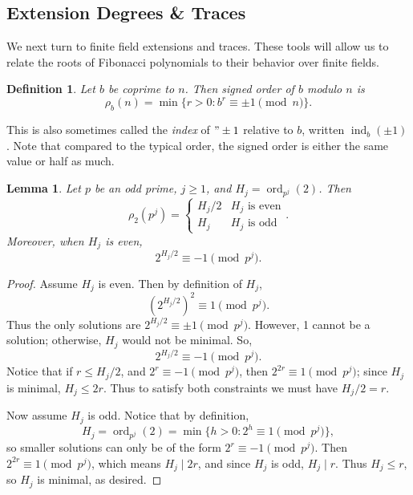 \documentclass[a4paper]{article}
\newtheorem{lemma}[theorem]{Lemma}
\newtheorem{definition}[theorem]{Definition}
\newcommand{\ord}[2][]{\operatorname{ord}_{#1}\!\left( #2 \right)}
\begin{document}
	\subsection{Extension Degrees \& Traces}
	We next turn to finite field extensions and traces.
	These tools will allow us to relate the roots of Fibonacci polynomials to their behavior over finite fields.
	
	\begin{definition}
		Let $b$ be coprime to $n$.
		Then \textit{signed order} of $b$ modulo $n$ is
		\begin{equation*}
			\rho_b(n) = \min{\{r > 0 : b^r \equiv \pm 1 \pmod{n}\}}.
		\end{equation*}
	\end{definition}
	This is also sometimes called the \textit{index} of $"\pm 1$ relative to $b$, written $\operatorname{ind}_{b}(\pm 1)$.
	Note that compared to the typical order, the signed order is either the same value or half as much.
	
	\begin{lemma}\label{signedOrder}
		Let $p$ be an odd prime, $j \ge 1$, and $H_j = \ord[p^j]{2}$.
		Then
		\begin{equation*}
			\rho_{2}{(p^j)} = \begin{cases}
				H_j / 2 & H_j \text{ is even} \\
				H_j & H_j \text{ is odd}
			\end{cases}.
		\end{equation*}
		Moreover, when $H_j$ is even,
		\begin{equation*}
			2^{H_j / 2} \equiv -1 \pmod{p^j}.
		\end{equation*}
	\end{lemma}
	\begin{proof}
		Assume $H_j$ is even.
		Then by definition of $H_j$,
		\begin{equation*}
			\left(2^{H_j / 2}\right)^2 \equiv 1 \pmod{p^j}.
		\end{equation*}
		Thus the only solutions are $2^{H_j / 2} \equiv \pm 1 \pmod{p^j}$.
		However, 1 cannot be a solution; otherwise, $H_j$ would not be minimal.
		So,
		\begin{equation*}
			2^{H_j / 2} \equiv -1 \pmod{p^j}.
		\end{equation*}
		Notice that if $r \leq H_j / 2$, and $2^r \equiv -1 \pmod{p^j}$, then $2^{2r} \equiv 1 \pmod{p^j}$; since $H_j$ is minimal, $H_j \leq 2r$.
		Thus to satisfy both constraints we must have $H_j / 2 = r$.
		
		Now assume $H_j$ is odd.
		Notice that by definition, 
		\begin{equation*}
			H_j = \ord[p^j]{2} = \min{\{h > 0 : 2^h \equiv 1 \pmod{p^j}\}},
		\end{equation*} 
		so smaller solutions can only be of the form $2^r \equiv -1 \pmod{p^j}$.
		Then $2^{2r} \equiv 1 \pmod{p^j}$, which means $H_j \mid 2r$, and since $H_j$ is odd, $H_j \mid r$.
		Thus $H_j \leq r$, so $H_j$ is minimal, as desired.
	\end{proof}
	
\end{document}
